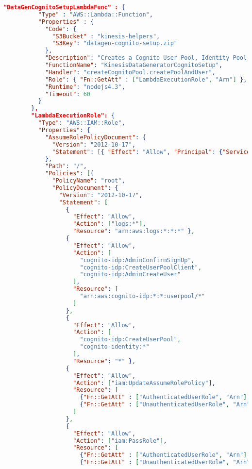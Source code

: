 \begin{lstlisting}[language=json,firstnumber=1]
        "DataGenCognitoSetupLambdaFunc" : {
          "Type" : "AWS::Lambda::Function",
          "Properties" : {
            "Code": {
              "S3Bucket" : "kinesis-helpers",
              "S3Key": "datagen-cognito-setup.zip"
            },
            "Description": "Creates a Cognito User Pool, Identity Pool, and a User.  Returns IDs to be used in the Kinesis Data Generator.",
            "FunctionName": "KinesisDataGeneratorCognitoSetup",
            "Handler": "createCognitoPool.createPoolAndUser",
            "Role": { "Fn::GetAtt" : ["LambdaExecutionRole", "Arn"] },
            "Runtime": "nodejs4.3",
            "Timeout": 60
          }
        },
        "LambdaExecutionRole": {
          "Type": "AWS::IAM::Role",
          "Properties": {
            "AssumeRolePolicyDocument": {
              "Version": "2012-10-17",
              "Statement": [{ "Effect": "Allow", "Principal": {"Service": ["lambda.amazonaws.com"]}, "Action": ["sts:AssumeRole"] }]
            },
            "Path": "/",
            "Policies": [{
              "PolicyName": "root",
              "PolicyDocument": {
                "Version": "2012-10-17",
                "Statement": [
                  {
                    "Effect": "Allow",
                    "Action": ["logs:*"],
                    "Resource": "arn:aws:logs:*:*:*" },
                  {
                    "Effect": "Allow",
                    "Action": [
                      "cognito-idp:AdminConfirmSignUp",
                      "cognito-idp:CreateUserPoolClient",
                      "cognito-idp:AdminCreateUser"
                    ],
                    "Resource": [
                      "arn:aws:cognito-idp:*:*:userpool/*"
                    ]
                  },
                  {
                    "Effect": "Allow",
                    "Action": [
                      "cognito-idp:CreateUserPool",
                      "cognito-identity:*"
                    ],
                    "Resource": "*" },
                  {
                    "Effect": "Allow",
                    "Action": ["iam:UpdateAssumeRolePolicy"],
                    "Resource": [
                      {"Fn::GetAtt" : ["AuthenticatedUserRole", "Arn"] },
                      {"Fn::GetAtt" : ["UnauthenticatedUserRole", "Arn"] }
                    ]
                  },
                  {
                    "Effect": "Allow",
                    "Action": ["iam:PassRole"],
                    "Resource": [
                      {"Fn::GetAtt" : ["AuthenticatedUserRole", "Arn"] },
                      {"Fn::GetAtt" : ["UnauthenticatedUserRole", "Arn"] }

\end{lstlisting}
